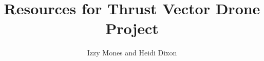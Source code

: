 \documentclass{article}
\title{Resources for Thrust Vector Drone Project}
\author{Izzy Mones and Heidi Dixon }
\date{ }
\begin{document}
	\maketitle
	\glsaddall
	\printglossaries
	
\end{document}
